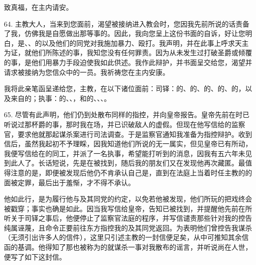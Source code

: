 致真福，在主内请安。\par

64. 主教大人，当来到您面前，渴望被接纳进入教会时，您因我先前所说的话责备了我，仿佛我是自愿做出那等事的。因此，我向您呈上这份书面的自诉，好让您明白，是、、的以及他们的同党对我施加暴力、殴打。我声明，并在此事上呼求天主为证，就他们所陈述的事，我知您没有任何罪责。因为从未发生过打破圣爵或倾覆的事，是他们用暴力手段迫使我如此供述。我作此辩护，并书面呈交给您，渴望并请求被接纳为您信众中的一员。我祈祷您在主内安康。\par

我将此亲笔函呈递给您，主教，在以下诸位面前：司铎：的、的、的、的、的，以及来自的；执事：的、、，和的、、、。\par

65. 尽管有此声明，他们仍到处散布同样的指控，并向皇帝报告。皇帝先前在时已听说过那杯爵的事，那时我在场，并已识破敌人的虚假。但现在他写信给的监察官，要求他就那起谋杀案进行司法调查。于是监察官通知我准备为指控辩护。收到信后，虽然我起初不予理睬，因我知道他们所说的无一属实，但见皇帝已有所动，我便写信给在的同工，并派了一名执事，希望能打听到的消息，因我有五六年未见到此人了。长话短说，先是在被找到，随后我的朋友们又在发现他再次藏匿。最值得注意的是，即便被发现后他仍不肯承认自己是，直到在法庭上当着时任主教的的面被定罪，最后出于羞惭，才不得不承认。\par

他如此行，是为履行他与及其同党的约定，以免若他被发现，他们所玩的把戏终会被戳穿；事实也确是如此。因当我写信给皇帝，告知已被找到，并提醒他先前在所听关于司铎之事后，他便停止了监察官法庭的程序，并写信谴责那些针对我的控告纯属诬蔑，且命令正要前往东方指控我的及其同党返回。为表明他们曾控告我谋杀（无须引出许多人的信件），这里只引述主教的一封信便足矣，从中可推知其余信函的基调。他得知了那也被称为的就谋杀一事对我散布的谣言，并听说尚在人世，便写了如下这封信。\par

